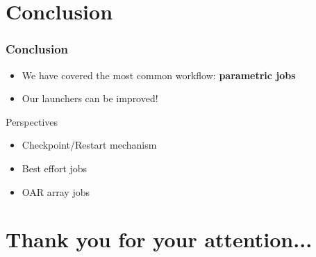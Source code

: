 \documentclass{beamer}
\begin{document}
\section{Conclusion}

\begin{frame}
    \frametitle{Conclusion}

    \begin{itemize}
      \item We have covered the most common workflow: \textbf{parametric jobs}
      \item Our launchers can be improved!
    \end{itemize}

    \begin{block}{Perspectives}
        \begin{itemize}
          \item Checkpoint/Restart mechanism
          \item Best effort jobs
          \item OAR array jobs
        \end{itemize}
    \end{block}


\end{frame}

\section*{Thank you for your attention...}
\end{document}
